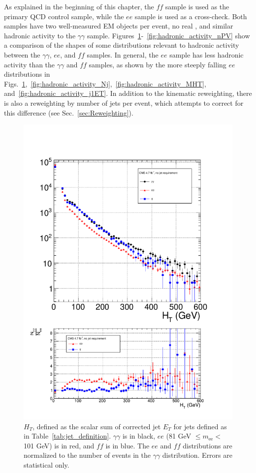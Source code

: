 \documentclass[dissertation_bw.tex]{subfiles}
\begin{document}
As explained in the beginning of this chapter, the $\mathit{ff}$ sample is used as the primary QCD control sample, while the $ee$ sample is used as a cross-check.  Both samples have two well-measured EM objects per event, no real \MET, and similar hadronic activity to the $\gamma\gamma$ sample.  Figures~\ref{fig:hadronic_activity_HT}-~\ref{fig:hadronic_activity_nPV} show a comparison of the shapes of some distributions relevant to hadronic activity between the $\gamma\gamma$, $ee$, and $\mathit{ff}$ samples.  In general, the $ee$ sample has less hadronic activity than the $\gamma\gamma$ and $\mathit{ff}$ samples, as shown by the more steeply falling $ee$ distributions in Figs.~\ref{fig:hadronic_activity_HT},~\ref{fig:hadronic_activity_Nj},~\ref{fig:hadronic_activity_MHT}, and~\ref{fig:hadronic_activity_j1ET}.  In addition to the kinematic reweighting, there is also a reweighting by number of jets per event, which attempts to correct for this difference (see Sec.~\ref{sec:Reweighting}).

\begin{figure}
	\centering
	\includegraphics[scale=0.5]{hadronic_activity_HT}
	\caption{$H_{T}$, defined as the scalar sum of corrected jet $E_{T}$ for jets defined as in Table~\ref{tab:jet_definition}.  $\gamma\gamma$ is in black, $ee$ (81 GeV $\leq m_{\mathrm{ee}} <$ 101 GeV) is in red, and $\mathit{ff}$ is in blue.  The $ee$ and $\mathit{ff}$ distributions are normalized to the number of events in the $\gamma\gamma$ distribution.  Errors are statistical only.}
	\label{fig:hadronic_activity_HT}
\end{figure}
\end{document}
